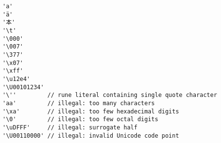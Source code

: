 \begin{lstlisting}[style=golang]
'a'
'ä'
'本'
'\t'
'\000'
'\007'
'\377'
'\x07'
'\xff'
'\u12e4'
'\U00101234'
'\''         // rune literal containing single quote character
'aa'         // illegal: too many characters
'\xa'        // illegal: too few hexadecimal digits
'\0'         // illegal: too few octal digits
'\uDFFF'     // illegal: surrogate half
'\U00110000' // illegal: invalid Unicode code point
\end{lstlisting}